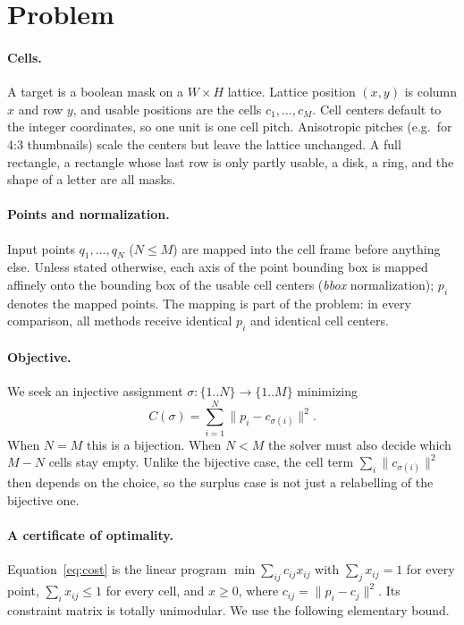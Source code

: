 \section{Problem}
\label{sec:problem}

\paragraph{Cells.} A target is a boolean mask on a $W\times H$ lattice. Lattice position
$(x,y)$ is column $x$ and row $y$, and usable positions are the cells
$c_1,\dots,c_M$. Cell centers default to the integer coordinates, so one unit is one cell
pitch. Anisotropic pitches (e.g.\ for 4:3 thumbnails) scale the centers but leave the
lattice unchanged. A full rectangle, a rectangle whose last row is only partly usable,
a disk, a ring, and the shape of a letter are all masks.

\paragraph{Points and normalization.} Input points $q_1,\dots,q_N$ ($N\le M$) are mapped
into the cell frame before anything else. Unless stated otherwise, each axis of the
point bounding box is mapped affinely onto the bounding box of the usable cell centers
(\emph{bbox} normalization); $p_i$ denotes the mapped points. The mapping is part of the
problem: in every comparison, all methods receive identical $p_i$ and identical cell
centers.

\paragraph{Objective.} We seek an injective assignment $\sigma:\{1..N\}\to\{1..M\}$
minimizing
\begin{equation}
  C(\sigma) = \sum_{i=1}^N \lVert p_i - c_{\sigma(i)}\rVert^2 .
  \label{eq:cost}
\end{equation}
When $N=M$ this is a bijection. When $N<M$ the solver must also decide which $M-N$ cells
stay empty. Unlike the bijective case, the cell term $\sum_i \lVert c_{\sigma(i)}\rVert^2$
then depends on the choice, so the surplus case is not just a relabelling of the
bijective one.

\paragraph{A certificate of optimality.} Equation~\eqref{eq:cost} is the linear program
$\min \sum_{ij} c_{ij}x_{ij}$ with $\sum_j x_{ij}=1$ for every point,
$\sum_i x_{ij}\le1$ for every cell, and $x\ge0$, where $c_{ij}=\lVert p_i-c_j\rVert^2$.
Its constraint matrix is totally unimodular. We use the following elementary bound.

